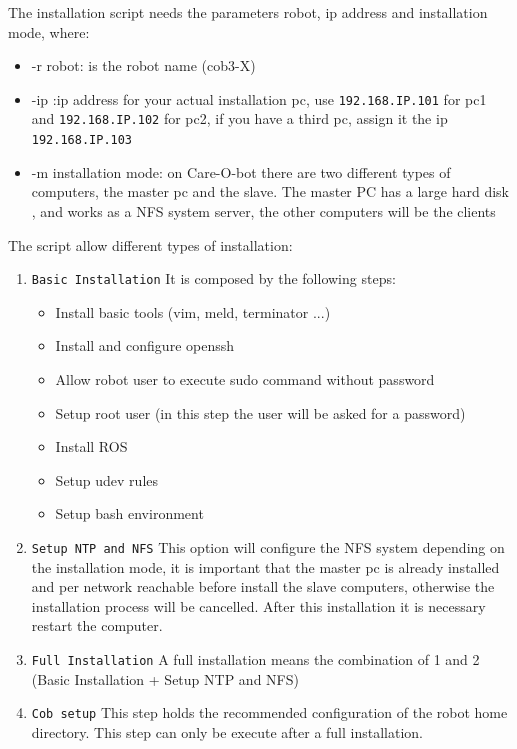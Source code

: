 The installation script needs the parameters robot, ip address and installation mode, where:
\begin{itemize}
\item -r robot: is the robot name (cob3-X)
\item -ip :ip address for your actual installation pc, use \texttt{192.168.IP.101} for pc1 and \texttt{192.168.IP.102} for pc2, if you have  a third pc, assign it the ip \texttt{192.168.IP.103}
\item -m installation mode: on Care-O-bot there are two different types of computers, the master pc and the slave. The master PC has a large hard disk , and works as a NFS system server, the other computers will be the clients
\end{itemize}

The script allow different types of installation:

\begin{enumerate}
\item \texttt{Basic Installation} It is composed by the following steps:
\begin{itemize}
\item Install basic tools (vim, meld, terminator ...)
\item Install and configure openssh
\item Allow robot user to execute sudo command without password
\item Setup root user (in this step the user will be asked for a password)
\item Install ROS
\item Setup udev rules
\item Setup bash environment 
\end{itemize}
\item \texttt{Setup NTP and NFS} This option will configure the NFS system depending on the installation mode, it is important that the master pc is already installed and per network reachable before install the slave computers, otherwise the installation process will be cancelled. After this installation it is necessary restart the computer.
\item \texttt{Full Installation} A full installation means the combination of 1 and 2 (Basic Installation + Setup NTP and NFS)
\item \texttt{Cob setup} This step holds the recommended configuration of the robot home directory. This step can only be execute after a full installation.
\end{enumerate}

